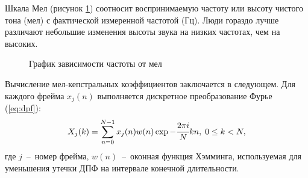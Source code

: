 Шкала Мел (рисунок \ref{fig:mel-hz}) соотносит воспринимаемую частоту или высоту чистого тона (мел) с фактической измеренной частотой (Гц). Люди гораздо лучше различают небольшие изменения высоты звука на низких частотах, чем на высоких.~\cite{mel} 
\begin{figure}[H]
	\centering
	\caption{График зависимости частоты от мел}
	\label{fig:mel-hz}
\end{figure}

Вычисление мел-кепстральных коэффициентов заключается в следующем. Для каждого фрейма $x_j(n)$ выполняется дискретное преобразование Фурье (\ref{eq:dpf}):
\begin{equation}\label{eq:dpf}
	X_j(k) = \displaystyle\sum_{n = 0}^{N-1} x_j(n)w(n)\exp{-\cfrac{2\pi i}{N}kn},\;0 \leq k < N,
\end{equation}
где $j$~--~номер фрейма, $w(n)$~--~оконная функция Хэмминга, используемая для уменьшения утечки ДПФ на интервале конечной длительности. 

